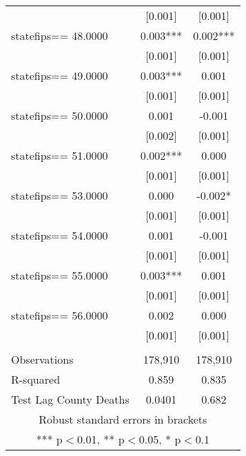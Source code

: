 \documentclass[]{article}
\begin{document}
\begin{tabular}{lcc}
 & [0.001] & [0.001] \\
statefips==    48.0000 & 0.003*** & 0.002*** \\
 & [0.001] & [0.001] \\
statefips==    49.0000 & 0.003*** & 0.001 \\
 & [0.001] & [0.001] \\
statefips==    50.0000 & 0.001 & -0.001 \\
 & [0.002] & [0.001] \\
statefips==    51.0000 & 0.002*** & 0.000 \\
 & [0.001] & [0.001] \\
statefips==    53.0000 & 0.000 & -0.002* \\
 & [0.001] & [0.001] \\
statefips==    54.0000 & 0.001 & -0.001 \\
 & [0.001] & [0.001] \\
statefips==    55.0000 & 0.003*** & 0.001 \\
 & [0.001] & [0.001] \\
statefips==    56.0000 & 0.002 & 0.000 \\
 & [0.001] & [0.001] \\
 &  &  \\
Observations & 178,910 & 178,910 \\
R-squared & 0.859 & 0.835 \\
 Test Lag County Deaths & 0.0401 & 0.682 \\ \hline
\multicolumn{3}{c}{ Robust standard errors in brackets} \\
\multicolumn{3}{c}{ *** p$<$0.01, ** p$<$0.05, * p$<$0.1} \\
\end{tabular}
\end{document}
